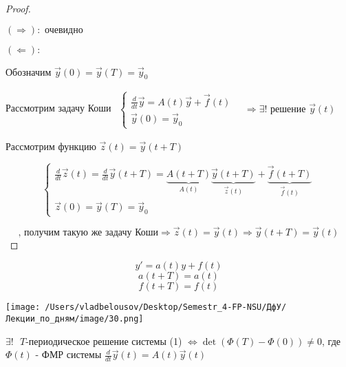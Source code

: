 \documentclass[12pt, a4paper]{report}
\begin{document}
\begin{proof} \(  \) 
    \begin{flushleft}
         \((\Rightarrow ): \text{ очевидно }  \)
    \end{flushleft}  

    \begin{flushleft}
        \( (\Leftarrow):  \) 
    \end{flushleft}

    Обозначим \( \vec{y } (0 )= \vec{y } (T )= \vec{y}  _0  \) 

    Рассмотрим задачу Коши \( \begin{aligned}
        \displaystyle \begin{cases}
            \displaystyle  \frac{d}{dt }  \vec{y }  = A(t ) \vec{y } + \vec{f }  (t)\\
            \vec{y } (0) = \vec{y } _0
            \end{cases}
            \quad \Rightarrow \exists  ! \text{ решение } \vec{y} (t ) 
    \end{aligned} \) 

    Рассмотрим функцию \( \vec{z } (t    ) = \vec{y } (t+T ) \) 

    \[ \begin{cases}
        \frac{d}{dt } \vec{z }  (t ) = \frac{d}{dt }  \vec{y }  (t +T) = \underbrace{A (t + T )}_{A(t )} \underbrace{\vec{y } (t+T )}_{\vec{z } (t )} +\underbrace{\vec{f }  (t + T )}_{\vec{f } (t )} \\
        \vec{z } (0) = \vec{y } (T ) = \vec{y } _0 
    \end{cases}\]  

\[  \text{, получим такую же задачу Коши}    \Rightarrow \vec{z } (t ) = \vec{y } (t ) \Rightarrow \vec{y } (t+T ) = \vec{y } (t)\] 
\end{proof}

\[ y ' = a(t ) y + f(t )\] 
\[ a(t +T ) = a(t ) \]  
\[ f(t+T ) = f(t )\]  

\begin{center}
    \texttt{[image: /Users/vladbelousov/Desktop/Semestr\_4-FP-NSU/ДфУ/Лекции\_по\_дням/image/30.png]}
\end{center}

\begin{theorem}
    \( \exists !    \text{ }  T\)-периодическое решение системы (1) \( \Leftrightarrow  \det (\Phi (T ) - \Phi (0)) \neq 0  \), где \( \Phi(t) \) - ФМР системы \( \displaystyle  \frac{d}{dt } \vec{y } (t )= A(t )\vec{y} (t) \) 
\end{theorem}
\end{document}
